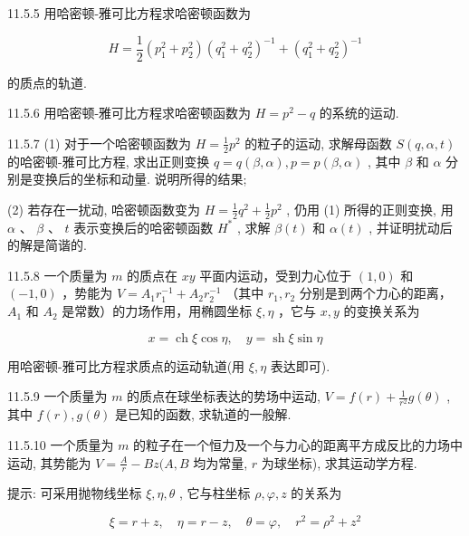 \begin{problem}{11.5.5}
用哈密顿-雅可比方程求哈密顿函数为

\[
H = \frac {1}{2} (p _ {1} ^ {2} + p _ {2} ^ {2}) (q _ {1} ^ {2} + q _ {2} ^ {2}) ^ {- 1} + (q _ {1} ^ {2} + q _ {2} ^ {2}) ^ {- 1}
\]

的质点的轨道.
\end{problem}
\clearpage


\begin{problem}{11.5.6}
用哈密顿-雅可比方程求哈密顿函数为 $H = p^2 - q$ 的系统的运动.
\end{problem}
\clearpage


\begin{problem}{11.5.7}
(1) 对于一个哈密顿函数为 $H = \frac{1}{2} p^2$ 的粒子的运动, 求解母函数 $S(q, \alpha, t)$ 的哈密顿-雅可比方程, 求出正则变换 $q = q(\beta, \alpha), p = p(\beta, \alpha)$ , 其中 $\beta$ 和 $\alpha$ 分别是变换后的坐标和动量. 说明所得的结果;

(2) 若存在一扰动, 哈密顿函数变为 $H = \frac{1}{2} q^2 + \frac{1}{2} p^2$ , 仍用 (1) 所得的正则变换, 用 $\alpha$ 、 $\beta$ 、 $t$ 表示变换后的哈密顿函数 $H^*$ , 求解 $\beta(t)$ 和 $\alpha(t)$ , 并证明扰动后的解是简谐的.
\end{problem}
\clearpage


\begin{problem}{11.5.8}
一个质量为 $m$ 的质点在 $xy$ 平面内运动，受到力心位于 $(1,0)$ 和 $(-1,0)$ ，势能为 $V = A_{1}r_{1}^{-1} + A_{2}r_{2}^{-1}$ （其中 $r_1, r_2$ 分别是到两个力心的距离， $A_{1}$ 和 $A_{2}$ 是常数）的力场作用，用椭圆坐标 $\xi, \eta$ ，它与 $x, y$ 的变换关系为

\[
x = \operatorname{ch} \xi \cos \eta , \quad y = \operatorname{sh} \xi \sin \eta
\]

用哈密顿-雅可比方程求质点的运动轨道(用 $\xi,\eta$ 表达即可).
\end{problem}
\clearpage


\begin{problem}{11.5.9}
一个质量为 $m$ 的质点在球坐标表达的势场中运动, $V = f(r) + \frac{1}{r^2} g(\theta)$ , 其中 $f(r), g(\theta)$ 是已知的函数, 求轨道的一般解.
\end{problem}
\clearpage


\begin{problem}{11.5.10}
一个质量为 $m$ 的粒子在一个恒力及一个与力心的距离平方成反比的力场中运动, 其势能为 $V = \frac{A}{r} - Bz (A, B$ 均为常量, $r$ 为球坐标), 求其运动学方程.

提示: 可采用抛物线坐标 $\xi, \eta, \theta$ , 它与柱坐标 $\rho, \varphi, z$ 的关系为

\[
\xi = r + z, \quad \eta = r - z, \quad \theta = \varphi , \quad r ^ {2} = \rho^ {2} + z ^ {2}
\]
\end{problem}
\clearpage


